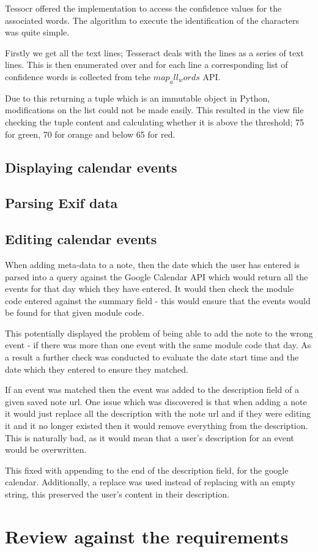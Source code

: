 Tessocr offered the implementation to access the confidence values for the associated words. The algorithm to execute the identification of the characters was quite simple.

Firstly we get all the text lines; Tesseract deals with the lines as a series of text lines. This is then enumerated over and for each line a corresponding list of confidence words is collected from tehe $map_all_words$ API.

Due to this returning a tuple which is an immutable object in Python, modifications on the list could not be made easily. This resulted in the view file checking the tuple content and calculating whether it is above the threshold; 75 for green, 70 for orange and below 65 for red.

\subsection{Displaying calendar events}

\subsection{Parsing Exif data}

\subsection{Editing calendar events}
When adding meta-data to a note, then the date which the user has entered is parsed into a query against the Google Calendar API which would return all the events for that day which they have entered. It would then check the module code entered against the summary field - this would ensure that the events would be found for that given module code.

This potentially displayed the problem of being able to add the note to the wrong event - if there was more than one event with the same module code that day. As a result a further check was conducted to evaluate the date start time and the date which they entered to ensure they matched.

If an event was matched then the event was added to the description field of a given saved note url. One issue which was discovered is that when adding a note it would just replace all the description with the note url and if they were editing it and it no longer existed then it would remove everything from the description. This is naturally bad, as it would mean that a user's description for an event would be overwritten.

This fixed with appending to the end of the description field, for the google calendar. Additionally, a replace was used instead of replacing with an empty string, this preserved the user's content in their description.



\section{Review against the requirements}
